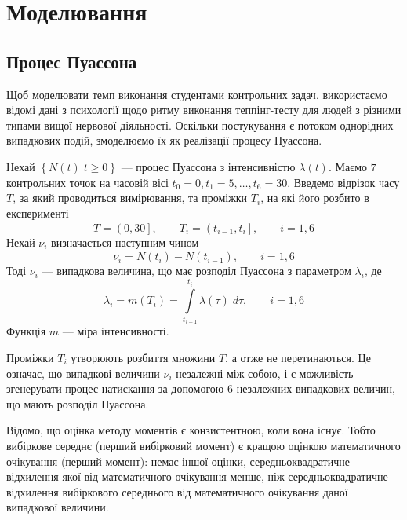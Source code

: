 \section{Моделювання}

\subsection{Процес Пуассона}
Щоб моделювати темп виконання студентами контрольних задач, використаємо
відомі дані з психології щодо ритму виконання теппінг-тесту для людей
з різними типами вищої нервової діяльності.
Оскільки постукування є потоком однорідних випадкових подій, змоделюємо їх
як реалізації процесу Пуассона.

Нехай $\left\{ N\left( t \right) \vert t \ge 0 \right\}$ --- процес Пуассона з
інтенсивністю $\lambda\left( t \right)$.
Маємо $7$ контрольних точок на часовій вісі $t_0 = 0, t_1 = 5, \dots, t_6 = 30$.
Введемо відрізок часу $T$, за який проводиться вимірювання,
та проміжки $T_i$, на які його розбито в експерименті
\begin{equation*}
  T = \left( 0, 30 \right], \qquad
  T_i = \left( t_{i-1}, t_i \right], \qquad
  i = \overline{1, 6}
\end{equation*}
Нехай $\nu_i$ визначається наступним чином
\begin{equation*}
  \nu_i = N\left( t_i \right) - N\left( t_{i-1} \right),
  \qquad i = \overline{1,6}
\end{equation*}
Тоді $\nu_i$ --- випадкова величина, що має розподіл Пуассона з параметром
$\lambda_i$, де \cite{Bulinsky:2003}
\begin{equation*}
  \lambda_i
  = m\left( T_i \right)
  = \int\limits_{t_{i-1}}^{t_i} \lambda\left( \tau \right) \; d\tau, \qquad
  i = \overline{1, 6}
\end{equation*}
Функція $m$ --- міра інтенсивності. \cite{Kingman:1992}

Проміжки $T_i$ утворюють розбиття множини $T$, а отже не перетинаються.
Це означає, що випадкові величини $\nu_i$ незалежні між собою,
і є можливість згенерувати процес натискання за допомогою $6$ незалежних
випадкових величин, що мають розподіл Пуассона.

Відомо, що оцінка методу моментів є конзистентною, коли вона існує.
Тобто вибіркове середнє (перший вибірковий момент) є кращою оцінкою
математичного очікування (перший момент): немає іншої оцінки,
середньоквадратичне відхилення якої від математичного очікування менше,
ніж середньоквадратичне відхилення вибіркового середнього від математичного
очікування даної випадкової величини.

